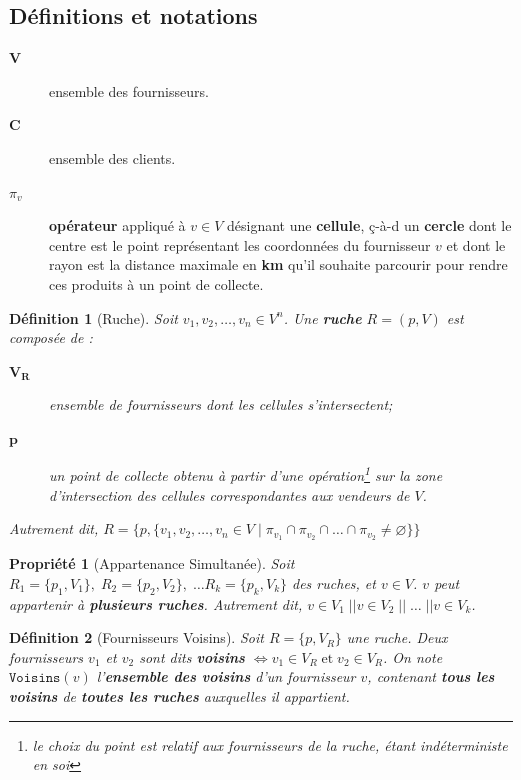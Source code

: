 \documentclass[a4paper,12pt]{book}
\theoremstyle{break}
\theoremstyle{break}
\newtheorem*{definition}{Définition}
\theoremstyle{break}
\newtheorem*{property}{Propriété}
\theoremstyle{break}
\theoremstyle{definition}
\theoremstyle{remark}
\begin{document}
\subsection{Définitions et notations}
\begin{description}
  \item[$\textbf{V}$]{ensemble des fournisseurs.}
  \item[$\textbf{C}$]{ensemble des clients.}
  \item[$\pi_v$]{\textbf{opérateur} appliqué à $v \in V$ désignant une \textbf{cellule}, ç-à-d un \textbf{cercle} dont le centre est le point représentant les coordonnées du fournisseur $v$ et dont le rayon est la distance maximale en \textbf{km} qu'il souhaite parcourir pour rendre ces produits à un point de collecte.}
\end{description}

\begin{definition}[Ruche]
Soit $v_1, v_2, \dots, v_n \in V^n$. Une \textbf{ruche} $R = (p, V)$ est composée de :
\begin{description}
  \item[$\mathbf{V_R}$]{ensemble de fournisseurs dont les cellules s'intersectent;}
  \item[$\mathbf{p}$]{un point de collecte obtenu à partir d'une opération\footnote{le choix du point est relatif aux fournisseurs de la ruche, étant indéterministe en soi} sur la zone d'intersection des cellules correspondantes aux vendeurs de $V$.}
\end{description}
Autrement dit, $R = \{p, \{v_1, v_2, \dots, v_n \in V\; |\; \pi_{v_1} \cap \pi_{v_2} \cap \dots \cap \pi_{v_2} \neq \varnothing\}\}$
\end{definition}

\begin{property}[Appartenance Simultanée]
Soit $R_1 = \{p_1, V_1\},\; R_2 = \{p_2, V_2\},\; \dots R_k = \{p_k, V_k\}$ des ruches, et $v \in V$. $v$ peut appartenir à \textbf{plusieurs ruches}. Autrement dit, $v \in V_1\; || v \in V_2\; ||\; \dots\; || v \in V_k$.
\end{property}

\begin{definition}[Fournisseurs Voisins]
Soit $R = \{p, V_R\}$ une ruche. Deux fournisseurs $v_1$ et $v_2$ sont dits \textbf{voisins} $\iff v_1 \in V_R\; \text{et}\; v_2 \in V_R$. On note $\texttt{Voisins}(v)$ l'\textbf{ensemble des voisins} d'un fournisseur $v$, contenant \textbf{tous les voisins} de \textbf{toutes les ruches} auxquelles il appartient.
\end{definition}
\end{document}
